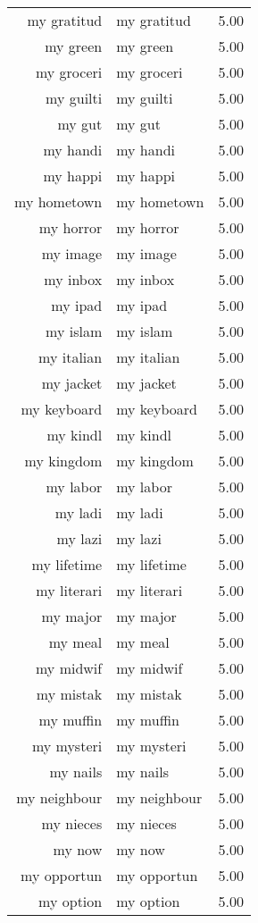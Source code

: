 \begin{table}[ht]
\begin{tabular}{rlr}
  my gratitud & my gratitud & 5.00 \\ 
  my green & my green & 5.00 \\ 
  my groceri & my groceri & 5.00 \\ 
  my guilti & my guilti & 5.00 \\ 
  my gut & my gut & 5.00 \\ 
  my handi & my handi & 5.00 \\ 
  my happi & my happi & 5.00 \\ 
  my hometown & my hometown & 5.00 \\ 
  my horror & my horror & 5.00 \\ 
  my image & my image & 5.00 \\ 
  my inbox & my inbox & 5.00 \\ 
  my ipad & my ipad & 5.00 \\ 
  my islam & my islam & 5.00 \\ 
  my italian & my italian & 5.00 \\ 
  my jacket & my jacket & 5.00 \\ 
  my keyboard & my keyboard & 5.00 \\ 
  my kindl & my kindl & 5.00 \\ 
  my kingdom & my kingdom & 5.00 \\ 
  my labor & my labor & 5.00 \\ 
  my ladi & my ladi & 5.00 \\ 
  my lazi & my lazi & 5.00 \\ 
  my lifetime & my lifetime & 5.00 \\ 
  my literari & my literari & 5.00 \\ 
  my major & my major & 5.00 \\ 
  my meal & my meal & 5.00 \\ 
  my midwif & my midwif & 5.00 \\ 
  my mistak & my mistak & 5.00 \\ 
  my muffin & my muffin & 5.00 \\ 
  my mysteri & my mysteri & 5.00 \\ 
  my nails & my nails & 5.00 \\ 
  my neighbour & my neighbour & 5.00 \\ 
  my nieces & my nieces & 5.00 \\ 
  my now & my now & 5.00 \\ 
  my opportun & my opportun & 5.00 \\ 
  my option & my option & 5.00 \\ 

\end{tabular}
\end{table}
